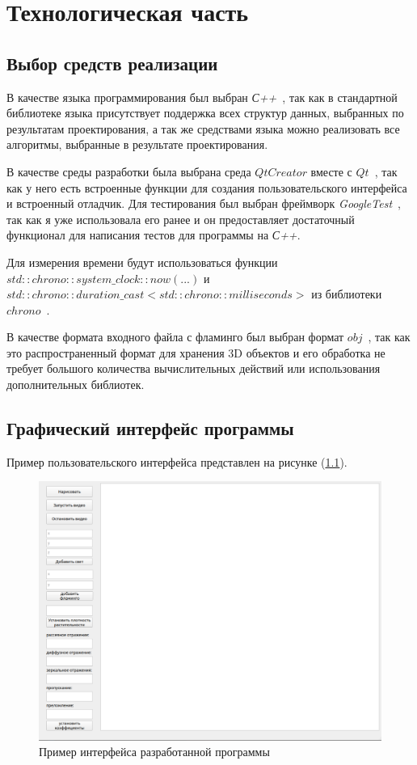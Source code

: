 \chapter{Технологическая часть}

\section{Выбор средств реализации}

В качестве языка программирования был выбран \textit{С++}~\cite{cpp}, так как в стандартной библиотеке языка присутствует поддержка всех структур данных, выбранных по результатам проектирования, а так же средствами языка можно реализовать все алгоритмы, выбранные в результате проектирования.

В качестве среды разработки была выбрана среда $Qt Creator$ вместе с $Qt$~\cite{qt}, так как у него есть встроенные функции для создания пользовательского интерфейса и встроенный отладчик.
Для тестирования был выбран фреймворк \textit{GoogleTest}~\cite{gtest}, так как я уже использовала его ранее и он предоставляет достаточный функционал для написания тестов для программы на \textit{С++}.

Для измерения времени будут использоваться функции \textit{$std::chrono::system\_clock::now(...)$} и \textit{$std::chrono::duration\_cast<std::chrono::milliseconds>$} из библиотеки $chrono$~\cite{cpp-lang-chrono}.

В качестве формата входного файла с фламинго был выбран формат $obj$~\cite{obj}, так как это распространенный формат для хранения 3D объектов и его обработка не требует большого количества  вычислительных действий или использования дополнительных библиотек.


\section{Графический интерфейс программы}

Пример пользовательского интерфейса представлен на рисунке (\ref{fig:inter}).
\clearpage
\begin{figure}[h!]
	\centering
	\includegraphics[width=0.9\linewidth]{img/inter}
	\caption{Пример интерфейса разработанной программы}
	\label{fig:inter}
\end{figure}

